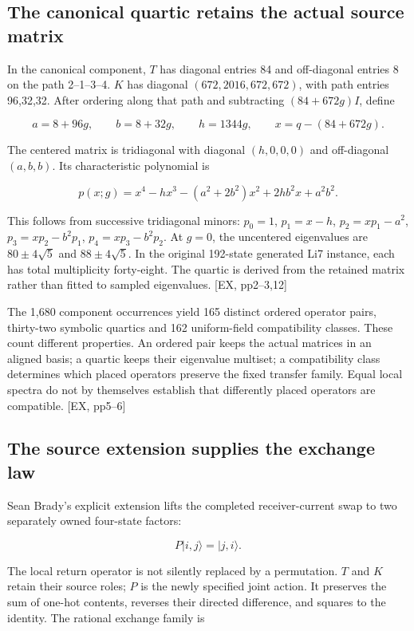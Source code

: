 \subsection{The canonical quartic retains the actual source matrix}\label{the-canonical-quartic-retains-the-actual-source-matrix}

In the canonical component, \(T\) has diagonal entries 84 and off-diagonal entries 8 on the path 2--1--3--4. \(K\) has diagonal \((672,2016,672,672)\), with path entries 96,32,32. After ordering along that path and subtracting \((84+672g)I\), define

\[
a=8+96g,\qquad b=8+32g,\qquad h=1344g,\qquad x=q-(84+672g).
\]

The centered matrix is tridiagonal with diagonal \((h,0,0,0)\) and off-diagonal \((a,b,b)\). Its characteristic polynomial is

\[
p(x;g)=x^4-hx^3-(a^2+2b^2)x^2+2hb^2x+a^2b^2.
\]

This follows from successive tridiagonal minors: \(p_0=1\), \(p_1=x-h\), \(p_2=xp_1-a^2\), \(p_3=xp_2-b^2p_1\), \(p_4=xp_3-b^2p_2\). At \(g=0\), the uncentered eigenvalues are \(80\pm4\sqrt5\) and \(88\pm4\sqrt5\). In the original 192-state generated Li7 instance, each has total multiplicity forty-eight. The quartic is derived from the retained matrix rather than fitted to sampled eigenvalues. {[}EX, pp2--3,12{]}

The 1,680 component occurrences yield 165 distinct ordered operator pairs, thirty-two symbolic quartics and 162 uniform-field compatibility classes. These count different properties. An ordered pair keeps the actual matrices in an aligned basis; a quartic keeps their eigenvalue multiset; a compatibility class determines which placed operators preserve the fixed transfer family. Equal local spectra do not by themselves establish that differently placed operators are compatible. {[}EX, pp5--6{]}

\subsection{The source extension supplies the exchange law}\label{the-source-extension-supplies-the-exchange-law}

Sean Brady's explicit extension lifts the completed receiver-current swap to two separately owned four-state factors:

\[
P\lvert i,j\rangle=\lvert j,i\rangle.
\]

The local return operator is not silently replaced by a permutation. \(T\) and \(K\) retain their source roles; \(P\) is the newly specified joint action. It preserves the sum of one-hot contents, reverses their directed difference, and squares to the identity. The rational exchange family is

